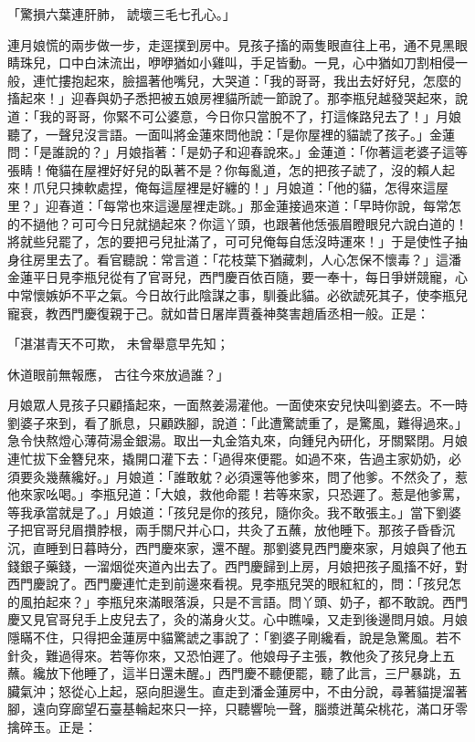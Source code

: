 \begin{showcontents}{}
「驚損六葉連肝肺，  諕壞三毛七孔心。」

連月娘慌的兩步做一步，走逕撲到房中。見孩子搐的兩隻眼直往上弔，通不見黑眼睛珠兒，口中白沫流出，咿咿猶如小雞叫，手足皆動。一見，心中猶如刀割相侵一般，連忙摟抱起來，臉搵著他嘴兒，大哭道：「我的哥哥，我出去好好兒，怎麼的搐起來！」迎春與奶子悉把被五娘房裡貓所諕一節說了。那李瓶兒越發哭起來，說道：「我的哥哥，你緊不可公婆意，今日你只當脫不了，打這條路兒去了！」月娘聽了，一聲兒沒言語。一面叫將金蓮來問他說：「是你屋裡的貓諕了孩子。」金蓮問：「是誰說的？」月娘指著：「是奶子和迎春說來。」金蓮道：「你著這老婆子這等張睛！俺貓在屋裡好好兒的臥著不是？你每亂道，怎的把孩子諕了，沒的賴人起來！爪兒只揀軟處捏，俺每這屋裡是好纏的！」月娘道：「他的貓，怎得來這屋里？」迎春道：「每常也來這邊屋裡走跳。」那金蓮接過來道：「早時你說，每常怎的不撾他？可可今日兒就撾起來？你這丫頭，也跟著他恁張眉瞪眼兒六說白道的！將就些兒罷了，怎的要把弓兒扯滿了，可可兒俺每自恁沒時運來！」于是使性子抽身往房里去了。看官聽說：常言道：「花枝葉下猶藏刺，人心怎保不懷毒？」這潘金蓮平日見李瓶兒從有了官哥兒，西門慶百依百隨，要一奉十，每日爭姘競寵，心中常懷嫉妒不平之氣。今日故行此陰謀之事，馴養此貓。必欲諕死其子，使李瓶兒寵衰，教西門慶復親于己。就如昔日屠岸賈養神獒害趙盾丞相一般。正是：

「湛湛青天不可欺，  未曾舉意早先知；

休道眼前無報應，  古往今來放過誰？」

月娘眾人見孩子只顧搐起來，一面熬姜湯灌他。一面使來安兒快叫劉婆去。不一時劉婆子來到，看了脈息，只顧跌腳，說道：「此遭驚諕重了，是驚風，難得過來。」急令快熬燈心薄荷湯金銀湯。取出一丸金箔丸來，向鍾兒內研化，牙關緊閉。月娘連忙拔下金簪兒來，撬開口灌下去：「過得來便罷。如過不來，告過主家奶奶，必須要灸幾蘸纔好。」月娘道：「誰敢躭？必須還等他爹來，問了他爹。不然灸了，惹他來家吆喝。」李瓶兒道：「大娘，救他命罷！若等來家，只恐遲了。惹是他爹罵，等我承當就是了。」月娘道：「孩兒是你的孩兒，隨你灸。我不敢張主。」當下劉婆子把官哥兒眉攢脖根，兩手關尺并心口，共灸了五蘸，放他睡下。那孩子昏昏沉沉，直睡到日暮時分，西門慶來家，還不醒。那劉婆見西門慶來家，月娘與了他五錢銀子藥錢，一溜烟從夾道內出去了。西門慶歸到上房，月娘把孩子風搐不好，對西門慶說了。西門慶連忙走到前邊來看視。見李瓶兒哭的眼紅紅的，問：「孩兒怎的風拍起來？」李瓶兒來滿眼落淚，只是不言語。問丫頭、奶子，都不敢說。西門慶又見官哥兒手上皮兒去了，灸的滿身火艾。心中瞧噪，又走到後邊問月娘。月娘隱瞞不住，只得把金蓮房中貓驚諕之事說了：「劉婆子剛纔看，說是急驚風。若不針灸，難過得來。若等你來，又恐怕遲了。他娘母子主張，教他灸了孩兒身上五蘸。纔放下他睡了，這半日還未醒。」西門慶不聽便罷，聽了此言，三尸暴跳，五臟氣沖；怒從心上起，惡向胆邊生。直走到潘金蓮房中，不由分說，尋著貓提溜著腳，遠向穿廊望石臺基輪起來只一捽，只聽響喨一聲，腦漿迸萬朵桃花，滿口牙零擒碎玉。正是：


\end{showcontents}
